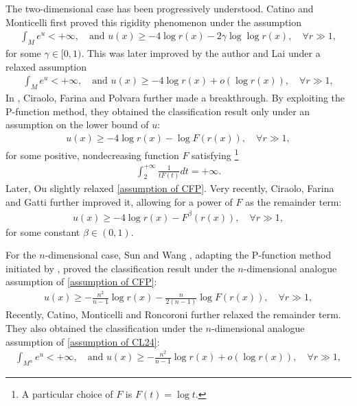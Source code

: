 \documentclass[12pt]{amsart}
\theoremstyle{plain}
\theoremstyle{definition}
\theoremstyle{remark}     %
\begin{document}
 The two-dimensional case has been progressively understood.
 Catino and Monticelli \cite[Theorem 1.6]{CM26} first proved this rigidity phenomenon under the assumption
 \begin{align}\label{eq. CM assumption_two dim}
         \int_M e^u<+\infty,\quad \text{and }
         u(x)\geq -4\log r(x)-2\gamma \log\log r(x),\quad \forall r\gg 1,
 \end{align}
 for some $\gamma\in[0,1)$.  
 This  was later improved by the author and Lai \cite[Theorem 2]{CL24} under a relaxed assumption
 \begin{align}\label{assumption of CL24}
         \int_M e^u<+\infty,\quad \text{and }
         u(x)\geq -4\log r(x)+o(\log r(x)),\quad \forall r\gg 1,
 \end{align}
 In \cite[Theorem 1.2]{CFP25}, Ciraolo, Farina and Polvara further made a breakthrough. By exploiting the P-function method, they obtained the classification result only under an assumption on the lower bound of $u$:
 \begin{align}\label{assumption of CFP}
     u(x)\geq -4\log r(x)-\log F(r(x)),\quad 
     \forall r\gg 1,
 \end{align}
 for some  positive, nondecreasing function $F$ satisfying \footnote{A particular choice of $F$ is $F(t)=\log t$.}
 \begin{align*}
     \int_2^{+\infty}\frac{1}{tF(t)}dt=+\infty.
 \end{align*}
 Later, Ou \cite[Theorem 1.1]{Ou26} slightly relaxed \cref{assumption of CFP}. Very recently, Ciraolo, Farina and Gatti \cite[Corollary 1.1.2]{CFG26} further improved it, allowing for  a power of $F$ as the remainder term:
 \begin{align*}
     u(x)\geq -4\log r(x)-F^\beta(r(x)),\quad 
     \forall r\gg 1,
 \end{align*}
 for some constant $\beta\in(0,1)$.

 For the $n$-dimensional case, 
Sun and Wang \cite[Theorem II]{SW25}, adapting the P-function method initiated by \cite{CFP25}, proved the classification result under the $n$-dimensional analogue assumption of \cref{assumption of CFP}: 
\begin{align*}
    u(x)\geq -\frac{n^2}{n-1}\log r(x)
         -\frac{n}{2(n-1)}\log F(r(x)),\quad \forall r\gg 1,
\end{align*}
Recently, Catino, Monticelli and Roncoroni \cite[Theorem 1.1]{CMR26} further relaxed the remainder term.
They  \cite[Theorem 1.3]{CMR26} also obtained the classification under the $n$-dimensional analogue assumption of \cref{assumption of CL24}:
\begin{align*}
         \int_{M^n} e^u<+\infty,\quad \text{and }
         u(x)\geq -\frac{n^2}{n-1}\log r(x)+o(\log r(x)),\quad \forall r\gg 1,
 \end{align*}
\end{document}
